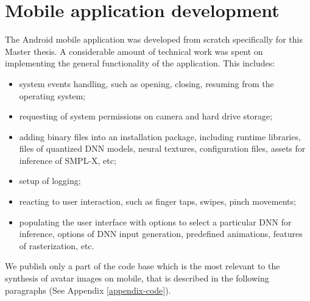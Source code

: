 \section{Mobile application development}
\label{methods:app}

The Android mobile application was developed from scratch specifically for this Master thesis. A considerable amount of technical work was spent on implementing the general functionality of the application. This includes:
\begin{itemize}
	\item system events handling, such as opening, closing, resuming from the operating system;
	\item requesting of system permissions on camera and hard drive storage;
	\item adding binary files into an installation package, including runtime libraries, files of quantized DNN models, neural textures, configuration files, assets for inference of SMPL-X, etc;
	\item setup of logging;
	\item reacting to user interaction, such as finger taps, swipes, pinch movements;
	\item populating the user interface with options to select a  particular DNN for inference, options of DNN input generation, predefined animations, features of rasterization, etc. 
\end{itemize}

We publish only a part of the code base which is the most relevant to the synthesis of avatar images on mobile, that is described in the following paragraphs (See Appendix \ref{appendix-code}).

